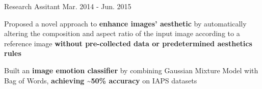 


\begin{cventries}


\cventrytwo
{Research Assitant{}} %
{Mar. 2014 -  Jun. 2015} %
{ %
\begin{cvitems}
\item {Proposed a novel approach to \textbf{enhance images' aesthetic} by automatically altering the 
composition and aspect ratio of the input image according to a reference image 
\textbf{without pre-collected data or predetermined aesthetics rules} }
\item {Built an \textbf{image emotion classifier} by combining Gaussian Mixture Model with Bag of
Words, \textbf{achieving  \textasciitilde50\% accuracy} on IAPS datasets}
\end{cvitems}
}

\end{cventries}